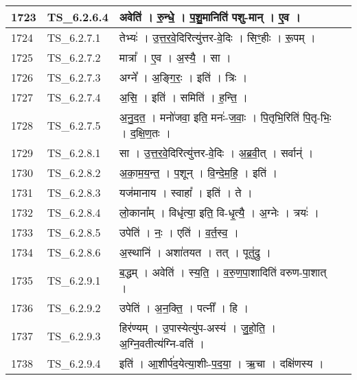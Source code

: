 \documentclass[17pt]{extarticle}
\begin{document}
\begin{longtable}{||p{0.4in}||p{0.9in}||p{4.0in}||p{0.9in}||}
        \hline
            1723 & TS\_6.2.6.4 & अवेति॑   ।   रु॒न्धे॒   ।   प॒शु॒मानिति॑ पशु{-}मान्   ।   ए॒व   ।    &      \\
        \hline
            1724 & TS\_6.2.7.1 & तेभ्यः॑   ।   उ॒त्त॒र॒वे॒दिरित्यु॑त्तर{-}वे॒दिः   ।   सिꣳ॒॒हीः   ।   रू॒पम्   ।    &      \\
        \hline
            1725 & TS\_6.2.7.2 & मात्रा᳚   ।   ए॒व   ।   अ॒स्यै॒   ।   सा   ।    &      \\
        \hline
            1726 & TS\_6.2.7.3 & अग्ने᳚   ।   अ॒ङ्गि॒रः॒   ।   इति॑   ।   त्रिः   ।    &      \\
        \hline
            1727 & TS\_6.2.7.4 & अ॒सि॒   ।   इति॑   ।   समिति॑   ।   ह॒न्ति॒   ।    &      \\
        \hline
            1728 & TS\_6.2.7.5 & अ॒नु॒द॒त॒   ।   मनो॑जवा॒ इति॒ मनः॑{-}ज॒वाः॒   ।   पि॒तृभि॒रिति॑ पि॒तृ{-}भिः॒   ।   द॒क्षि॒ण॒तः   ।    &      \\
        \hline
            1729 & TS\_6.2.8.1 & सा   ।   उ॒त्त॒र॒वे॒दिरित्यु॑त्तर{-}वे॒दिः   ।   अ॒ब्र॒वी॒त्   ।   सर्वान्॑   ।    &      \\
        \hline
            1730 & TS\_6.2.8.2 & अ॒का॒म॒य॒न्त॒   ।   प॒शून्   ।   वि॒न्दे॒म॒हि॒   ।   इति॑   ।    &      \\
        \hline
            1731 & TS\_6.2.8.3 & यज॑मानाय   ।   स्वाहा᳚   ।   इति॑   ।   ते   ।    &      \\
        \hline
            1732 & TS\_6.2.8.4 & लो॒काना᳚म्   ।   विधृ॑त्या॒ इति॒ वि{-}धृ॒त्यै॒   ।   अ॒ग्नेः   ।   त्रयः॑   ।    &      \\
        \hline
            1733 & TS\_6.2.8.5 & उपेति॑   ।   नः॒   ।   एति॑   ।   व॒र्त॒स्व॒   ।    &      \\
        \hline
            1734 & TS\_6.2.8.6 & अ॒स्थानि॑   ।   अशा॑तयत   ।   तत्   ।   पूतु॑द्रु   ।    &      \\
        \hline
            1735 & TS\_6.2.9.1 & ब॒द्धम्   ।   अवेति॑   ।   स्य॒ति॒   ।   व॒रु॒ण॒पा॒शादिति॑ वरुण{-}पा॒शात्   ।    &      \\
        \hline
            1736 & TS\_6.2.9.2 & उपेति॑   ।   अ॒न॒क्ति॒   ।   पत्नी᳚   ।   हि   ।    &      \\
        \hline
            1737 & TS\_6.2.9.3 & हिर॑ण्यम्   ।   उ॒पास्येत्यु॑प{-}अस्य॑   ।   जु॒हो॒ति॒   ।   अ॒ग्नि॒वतीत्य॑ग्नि{-}वति॑   ।    &      \\
        \hline
            1738 & TS\_6.2.9.4 & इति॑   ।   आ॒शीर्प॑द॒येत्या॒शीः{-}प॒द॒या॒   ।   ऋ॒चा   ।   दक्षि॑णस्य   ।    &      \\

\end{longtable}
\end{document}
